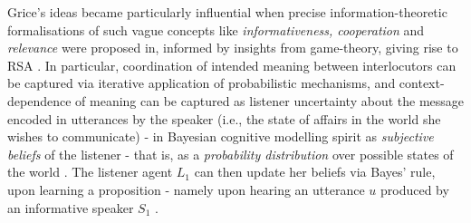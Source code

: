 Grice’s ideas became particularly influential when precise information-theoretic formalisations of such vague concepts like \emph{informativeness, cooperation} and \emph{relevance} were proposed in, informed by insights from game-theory, giving rise to RSA \parencite{frank2012predicting}.
In particular, coordination of intended meaning between interlocutors can be captured via iterative application of probabilistic mechanisms, and context-dependence of meaning can be captured as listener uncertainty about the message encoded in utterances by the speaker (i.e., the state of affairs in the world she wishes to communicate) - in Bayesian cognitive modelling spirit as \emph{subjective beliefs} of the listener - that is, as a \emph{probability distribution} over possible states of the world \parencite{tenenbaum2011grow}. The listener agent $L_1$ can then update her beliefs via Bayes' rule, upon learning a proposition - namely upon hearing an utterance $u$ produced by an informative speaker $S_1$ \parencite{frank2012predicting}.

